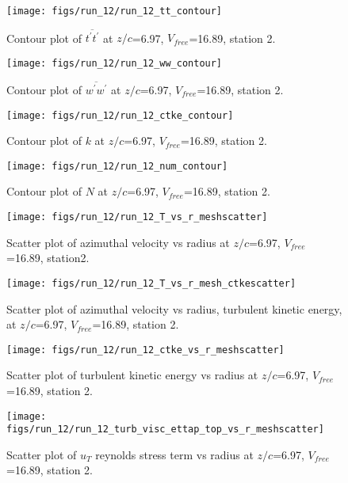 \begin{figure}[H]
\centering
\texttt{[image: figs/run\_12/run\_12\_tt\_contour]}
\caption{Contour plot of $\overline{t^\prime t^\prime}$ at $z/c$=6.97, $V_{free}$=16.89, station 2.}
\end{figure}


\begin{figure}[H]
\centering
\texttt{[image: figs/run\_12/run\_12\_ww\_contour]}
\caption{Contour plot of $\overline{w^\prime w^\prime}$ at $z/c$=6.97, $V_{free}$=16.89, station 2.}
\end{figure}


\begin{figure}[H]
\centering
\texttt{[image: figs/run\_12/run\_12\_ctke\_contour]}
\caption{Contour plot of $k$ at $z/c$=6.97, $V_{free}$=16.89, station 2.}
\end{figure}


\begin{figure}[H]
\centering
\texttt{[image: figs/run\_12/run\_12\_num\_contour]}
\caption{Contour plot of $N$ at $z/c$=6.97, $V_{free}$=16.89, station 2.}
\end{figure}


\begin{figure}[H]
\centering
\texttt{[image: figs/run\_12/run\_12\_T\_vs\_r\_meshscatter]}
\caption{Scatter plot of azimuthal velocity vs radius at $z/c$=6.97, $V_{free}$=16.89, station2.}
\end{figure}


\begin{figure}[H]
\centering
\texttt{[image: figs/run\_12/run\_12\_T\_vs\_r\_mesh\_ctkescatter]}
\caption{Scatter plot of azimuthal velocity vs radius, turbulent kinetic energy, at $z/c$=6.97, $V_{free}$=16.89, station 2.}
\end{figure}


\begin{figure}[H]
\centering
\texttt{[image: figs/run\_12/run\_12\_ctke\_vs\_r\_meshscatter]}
\caption{Scatter plot of turbulent kinetic energy vs radius at $z/c$=6.97, $V_{free}$=16.89, station 2.}
\end{figure}


\begin{figure}[H]
\centering
\texttt{[image: figs/run\_12/run\_12\_turb\_visc\_ettap\_top\_vs\_r\_meshscatter]}
\caption{Scatter plot of $
u_T$ reynolds stress term vs radius at $z/c$=6.97, $V_{free}$=16.89, station 2.}
\end{figure}


